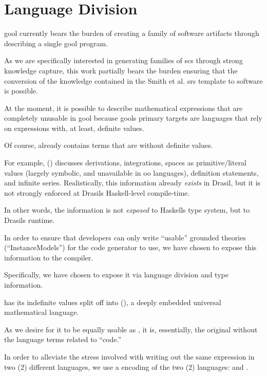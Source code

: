 \section{Language Division}

\acs{gool} currently bears the burden of creating a family of software artifacts
through describing a single \acs{gool} program.

As we are specifically interested in generating families of \acs{scs} through
strong knowledge capture, this work partially bears the burden ensuring that the
conversion of the knowledge contained in the Smith et al. \acs{srs} template
\cite{SmithAndLai2005} to software is possible.

At the moment, it is possible to describe mathematical expressions that are
completely unusable in \acs{gool} because \acsp{gool} primary targets are
languages that rely on expressions with, at least, definite values.

Of course, \Expr{} already contains terms that are without definite values.

For example, \Expr{} () discusses derivations,
integrations, spaces as primitive/literal values (largely symbolic, and
unavailable in \acs{oo} languages), definition statements, and infinite series.
Realistically, this information already \textit{exists} in Drasil, but it is not
strongly enforced at Drasils Haskell-level compile-time.

In other words, the information is not \textit{exposed} to Haskells type system,
but to Drasils runtime.




In order to ensure that developers can only write ``usable'' grounded theories
(``InstanceModels'') for the code generator to use, we have chosen to expose
this information to the compiler.

Specifically, we have chosen to expose it via language division and type
information.

\languageDivision{}

\Expr{} has its indefinite values split off into \ModelExpr{}
(), a deeply embedded universal mathematical
language.

As we desire for it to be equally usable as \Expr{}, it is, essentially, the
original \Expr{} without the language terms related to ``code.''

In order to alleviate the stress involved with writing out the same expression
in two (2) different languages, we use a  encoding of the two (2)
languages:  and . 

